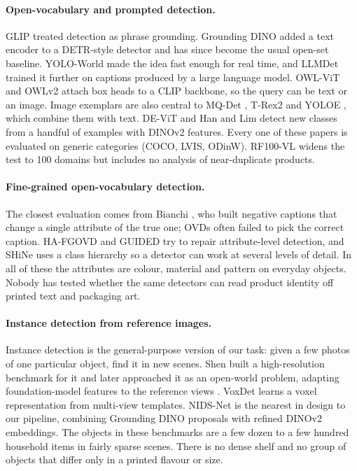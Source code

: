 \documentclass[10pt,twocolumn,letterpaper]{article}
\begin{document}
\paragraph{Open-vocabulary and prompted detection.}
GLIP \cite{li2022glip} treated detection as phrase grounding. Grounding DINO \cite{liu2024groundingdino} added a text encoder to a DETR-style detector and has since become the usual open-set baseline. YOLO-World \cite{cheng2024yoloworld} made the idea fast enough for real time, and LLMDet \cite{fu2025llmdet} trained it further on captions produced by a large language model. OWL-ViT and OWLv2 \cite{minderer2022owlvit,minderer2023owlv2} attach box heads to a CLIP \cite{radford2021clip} backbone, so the query can be text or an image. Image exemplars are also central to MQ-Det \cite{xu2023mqdet}, T-Rex2 \cite{jiang2024trex2} and YOLOE \cite{wang2025yoloe}, which combine them with text. DE-ViT \cite{zhang2024devit} and Han and Lim \cite{han2024fmfsod} detect new classes from a handful of examples with DINOv2 \cite{oquab2024dinov2} features. Every one of these papers is evaluated on generic categories (COCO, LVIS, ODinW). RF100-VL \cite{popov2025rf100vl} widens the test to 100 domains but includes no analysis of near-duplicate products.

\paragraph{Fine-grained open-vocabulary detection.}
The closest evaluation comes from Bianchi \etal \cite{bianchi2024devil}, who built negative captions that change a single attribute of the true one; OVDs often failed to pick the correct caption. HA-FGOVD \cite{ma2025hafgovd} and GUIDED \cite{li2025guided} try to repair attribute-level detection, and SHiNe \cite{liu2024shine} uses a class hierarchy so a detector can work at several levels of detail. In all of these the attributes are colour, material and pattern on everyday objects. Nobody has tested whether the same detectors can read product identity off printed text and packaging art.

\paragraph{Instance detection from reference images.}
Instance detection is the general-purpose version of our task: given a few photos of one particular object, find it in new scenes. Shen \etal built a high-resolution benchmark for it \cite{shen2023hrinsdet} and later approached it as an open-world problem, adapting foundation-model features to the reference views \cite{shen2025idow}. VoxDet \cite{li2023voxdet} learns a voxel representation from multi-view templates. NIDS-Net \cite{lu2025nidsnet} is the nearest in design to our pipeline, combining Grounding DINO proposals with refined DINOv2 embeddings. The objects in these benchmarks are a few dozen to a few hundred household items in fairly sparse scenes. There is no dense shelf and no group of objects that differ only in a printed flavour or size.
\end{document}

